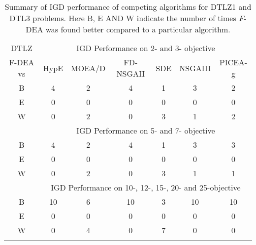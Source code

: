 \begin{table}[htbp]
\centering
\caption{Summary of IGD performance of competing algorithms for DTLZ1 and DTL3 problems. Here B, E AND W indicate the number of times  $F$-DEA was found better compared to a particular algorithm.}
\label{table:dtlzigdsummary}
\renewcommand{\arraystretch}{1.1}
\begin{adjustbox}{width=0.50\textwidth,center}
\begin{tabular}{c|cccccc}
\thickhline
DTLZ & \multicolumn{6}{c}{IGD Performance on 2-  and 3- objective} \\\thickhline
F-DEA vs & HypE & MOEA/D & FD-NSGAII & SDE & NSGAIII & PICEA-g \\\thickhline
B & 4 & 2 & 4 & 1 & 3 & 2 \\
E & 0 & 0 & 0 & 0 & 0 & 0 \\
W & 0 & 2 & 0 & 3 & 1 & 2 \\\thickhline
 & \multicolumn{6}{c}{IGD Performance on 5- and 7- objective} \\\thickhline
B & 4 & 2 & 4 & 1 & 3 & 3 \\
E & 0 & 0 & 0 & 0 & 0 & 0 \\
W & 0 & 2 & 0 & 3 & 1 & 1\\\thickhline
 & \multicolumn{6}{c}{IGD Performance on 10-, 12-, 15-, 20- and 25-objective} \\\thickhline
B & 10 & 6 & 10 & 3 & 10 & 10 \\
E & 0  & 0 & 0  & 0 & 0  & 0  \\
W & 0  & 4 & 0  & 7 & 0  & 0  \\\thickhline
\end{tabular}
\end{adjustbox}
\end{table}


